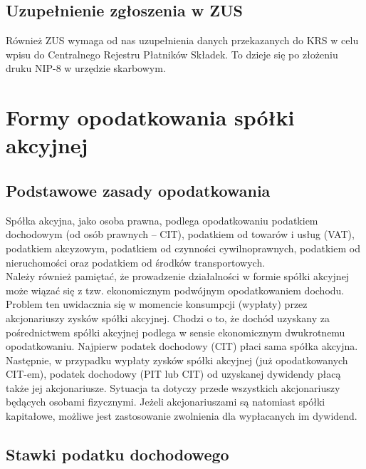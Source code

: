 \documentclass[11pt]{article}
\begin{document}
\subsection{Uzupełnienie zgłoszenia w ZUS}


Również ZUS wymaga od nas uzupełnienia danych przekazanych do KRS w celu wpisu do Centralnego Rejestru Płatników Składek. To dzieje się po złożeniu druku NIP-8 w urzędzie skarbowym.




	
	\section{Formy opodatkowania spółki akcyjnej}
	
	\subsection{Podstawowe zasady opodatkowania}
	Spółka akcyjna, jako osoba prawna, podlega opodatkowaniu podatkiem dochodowym (od osób prawnych – CIT), podatkiem od towarów i usług (VAT), podatkiem akcyzowym, podatkiem od czynności cywilnoprawnych, podatkiem od nieruchomości oraz podatkiem od środków transportowych.\\
	Należy również pamiętać, że prowadzenie działalności w formie spółki akcyjnej może wiązać się z tzw. ekonomicznym podwójnym opodatkowaniem dochodu. Problem ten uwidacznia się w momencie konsumpcji (wypłaty) przez akcjonariuszy zysków spółki akcyjnej. Chodzi o to, że dochód uzyskany za pośrednictwem spółki akcyjnej podlega w sensie ekonomicznym dwukrotnemu opodatkowaniu. Najpierw podatek dochodowy (CIT) płaci sama spółka akcyjna. Następnie, w przypadku wypłaty zysków spółki akcyjnej (już opodatkowanych CIT-em), podatek dochodowy (PIT lub CIT) od uzyskanej dywidendy płacą także jej akcjonariusze. Sytuacja ta dotyczy przede wszystkich akcjonariuszy będących osobami fizycznymi. Jeżeli akcjonariuszami są natomiast spółki kapitałowe, możliwe jest zastosowanie zwolnienia dla wypłacanych im dywidend.
	
	\subsection{Stawki podatku dochodowego}
	
\end{document}
